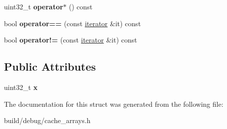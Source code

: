 \begin{DoxyCompactItemize}
\item 
\hypertarget{structSetAssocCands_1_1iterator_a4d450ed0e6772ec671a108feedd60cde}{uint32\-\_\-t {\bfseries operator$\ast$} () const }\label{structSetAssocCands_1_1iterator_a4d450ed0e6772ec671a108feedd60cde}

\item 
\hypertarget{structSetAssocCands_1_1iterator_a4bbcff037b552d5c3d688d99dc5213e4}{bool {\bfseries operator==} (const \hyperlink{structSetAssocCands_1_1iterator}{iterator} \&it) const }\label{structSetAssocCands_1_1iterator_a4bbcff037b552d5c3d688d99dc5213e4}

\item 
\hypertarget{structSetAssocCands_1_1iterator_a555a0a7326ba2905645da079a6ede142}{bool {\bfseries operator!=} (const \hyperlink{structSetAssocCands_1_1iterator}{iterator} \&it) const }\label{structSetAssocCands_1_1iterator_a555a0a7326ba2905645da079a6ede142}

\end{DoxyCompactItemize}
\subsection*{Public Attributes}
\begin{DoxyCompactItemize}
\item 
\hypertarget{structSetAssocCands_1_1iterator_a524ac7e35f5ea7b1ea98423cb1dac1d4}{uint32\-\_\-t {\bfseries x}}\label{structSetAssocCands_1_1iterator_a524ac7e35f5ea7b1ea98423cb1dac1d4}

\end{DoxyCompactItemize}


The documentation for this struct was generated from the following file\-:\begin{DoxyCompactItemize}
\item 
build/debug/cache\-\_\-arrays.\-h\end{DoxyCompactItemize}
